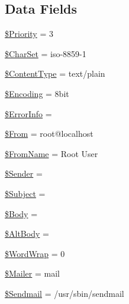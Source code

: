 \subsection*{Data Fields}
\begin{DoxyCompactItemize}
\item 
\hyperlink{class_p_h_p_mailer_a7c6546640ba3eafd143d8f0e6805de27}{\$\+Priority} = 3
\item 
\hyperlink{class_p_h_p_mailer_aafc11e59da1a3f7e242b6987f1cb514a}{\$\+Char\+Set} = \textquotesingle{}iso-\/8859-\/1\textquotesingle{}
\item 
\hyperlink{class_p_h_p_mailer_a35c42684e94e56e60bfc1a8ec2cbcd08}{\$\+Content\+Type} = \textquotesingle{}text/plain\textquotesingle{}
\item 
\hyperlink{class_p_h_p_mailer_a7c44f20127f1436e9315b5fcfee472f3}{\$\+Encoding} = \textquotesingle{}8bit\textquotesingle{}
\item 
\hyperlink{class_p_h_p_mailer_a4aa7f2e8bf834210cc4522666115e03e}{\$\+Error\+Info} = \textquotesingle{}\textquotesingle{}
\item 
\hyperlink{class_p_h_p_mailer_a9f9e5bc6226feedebe3135b210eb5ef8}{\$\+From} = \textquotesingle{}root@localhost\textquotesingle{}
\item 
\hyperlink{class_p_h_p_mailer_a0338c56bfb2ac4229c555a97222f47c2}{\$\+From\+Name} = \textquotesingle{}Root User\textquotesingle{}
\item 
\hyperlink{class_p_h_p_mailer_a0fd52b1481fe1434c5810ca3cb098985}{\$\+Sender} = \textquotesingle{}\textquotesingle{}
\item 
\hyperlink{class_p_h_p_mailer_a2b58ba25576b17f0a874336a68a44a62}{\$\+Subject} = \textquotesingle{}\textquotesingle{}
\item 
\hyperlink{class_p_h_p_mailer_afcecd01958faa0a6eec878226ffe09f1}{\$\+Body} = \textquotesingle{}\textquotesingle{}
\item 
\hyperlink{class_p_h_p_mailer_a5a3adc4eeed7620a1290e2364cee9084}{\$\+Alt\+Body} = \textquotesingle{}\textquotesingle{}
\item 
\hyperlink{class_p_h_p_mailer_a8e8553ff133401f5324229a988995a34}{\$\+Word\+Wrap} = 0
\item 
\hyperlink{class_p_h_p_mailer_a7792543896c9a827d4bfd3e29d2e0b01}{\$\+Mailer} = \textquotesingle{}mail\textquotesingle{}
\item 
\hyperlink{class_p_h_p_mailer_aea0de75e10af3f581a0a412f41b9db66}{\$\+Sendmail} = \textquotesingle{}/usr/sbin/sendmail\textquotesingle{}
\item 

\end{DoxyCompactItemize}
